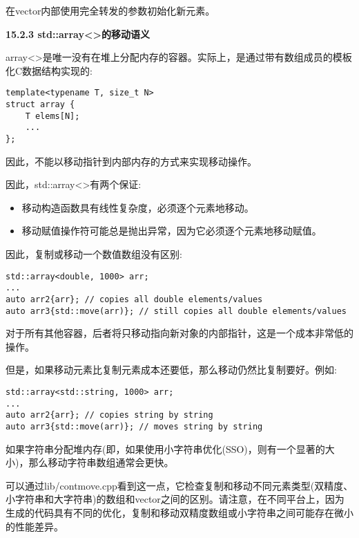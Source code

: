 在vector内部使用完全转发的参数初始化新元素。\par

\hspace*{\fill} \par %
\textbf{15.2.3 std::array<>的移动语义}

array<>是唯一没有在堆上分配内存的容器。实际上，是通过带有数组成员的模板化C数据结构实现的:\par

\begin{lstlisting}[caption={}]
template<typename T, size_t N>
struct array {
	T elems[N];
	...
};
\end{lstlisting}

因此，不能以移动指针到内部内存的方式来实现移动操作。\par

因此，std::array<>有两个保证:\par

\begin{itemize}
	\item 移动构造函数具有线性复杂度，必须逐个元素地移动。
	\item 移动赋值操作符可能总是抛出异常，因为它必须逐个元素地移动赋值。
\end{itemize}

因此，复制或移动一个数值数组没有区别:\par

\begin{lstlisting}[caption={}]
std::array<double, 1000> arr;
...
auto arr2{arr}; // copies all double elements/values
auto arr3{std::move(arr)}; // still copies all double elements/values
\end{lstlisting}

对于所有其他容器，后者将只移动指向新对象的内部指针，这是一个成本非常低的操作。\par

但是，如果移动元素比复制元素成本还要低，那么移动仍然比复制要好。例如:\par

\begin{lstlisting}[caption={}]
std::array<std::string, 1000> arr;
...
auto arr2{arr}; // copies string by string
auto arr3{std::move(arr)}; // moves string by string
\end{lstlisting}

如果字符串分配堆内存(即，如果使用小字符串优化(SSO)，则有一个显著的大小)，那么移动字符串数组通常会更快。\par

可以通过lib/contmove.cpp看到这一点，它检查复制和移动不同元素类型(双精度、小字符串和大字符串)的数组和vector之间的区别。请注意，在不同平台上，因为生成的代码具有不同的优化，复制和移动双精度数组或小字符串之间可能存在微小的性能差异。\par





















